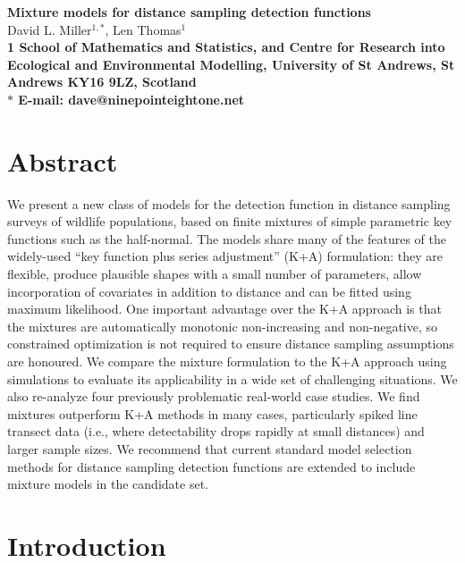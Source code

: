 \documentclass[10pt]{article}
\date{}
\begin{document}
\begin{flushleft}
{\Large
\textbf{Mixture models for distance sampling detection functions}
}
\\
David L. Miller$^{1,\ast}$,
Len Thomas$^{1}$
\\
\bf{1} School of Mathematics and Statistics, and Centre for Research into Ecological and Environmental Modelling, University of St Andrews, St Andrews KY16 9LZ, Scotland
\\
$\ast$ E-mail: dave@ninepointeightone.net
\end{flushleft}

\section*{Abstract}

We present a new class of models for the detection function in distance sampling surveys of wildlife populations, based on finite mixtures of simple parametric key functions such as the half-normal. The models share many of the features of the widely-used ``key function plus series adjustment'' (K+A) formulation: they are flexible, produce plausible shapes with a small number of parameters, allow incorporation of covariates in addition to distance and can be fitted using maximum likelihood. One important advantage over the K+A approach is that the mixtures are automatically monotonic non-increasing and non-negative, so constrained optimization is not required to ensure distance sampling assumptions are honoured. We compare the mixture formulation to the K+A approach using simulations to evaluate its applicability in a wide set of challenging situations. We also re-analyze four previously problematic real-world case studies.  We find mixtures outperform K+A methods in many cases, particularly spiked line transect data (i.e., where detectability drops rapidly at small distances) and larger sample sizes.  We recommend that current standard model selection methods for distance sampling detection functions are extended to include mixture models in the candidate set.


\section*{Introduction}
\end{document}
